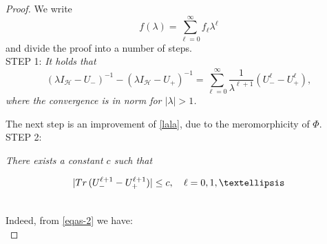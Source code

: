 \documentclass[10pt,a4paper]{amsart}
\begin{document}
      \begin{proof} We write
        \begin{equation}
          f(\lambda)=\sum_{\ell=0}^\infty f_\ell\lambda^\ell
        \end{equation}
        and divide the proof into a number of steps.\\

        STEP 1: {\sl It holds that
\[
  ( \lambda I_{\mathcal H}-U_-)^{-1}-({\lambda}I_{\mathcal H}-U_+)^{-1}=\sum_{\ell=0}^\infty
  \frac{1}{\lambda^{\ell+1}}\left(U_-^\ell-U_+^\ell\right),
\]
where the convergence is in norm for $|\lambda|>1$.\\
}

The next step is an improvement of \eqref{lala}, due to the meromorphicity of $\Phi$.\\

STEP 2: {\sl There exists a constant $c$ such that

\begin{equation}
  | {\rm Tr}\,(U_-^{\ell+1}-U_+^{\ell+1})|\le c ,\quad \ell=0,1,\ldots
  \label{lalala}
\end{equation}
}\\


Indeed, from \eqref{eqas-2} we have:\\


\end{proof}
\end{document}
